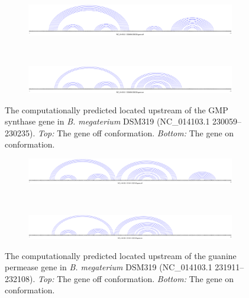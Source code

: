 \begin{figure}[!ht]
\centering
\begin{subfigure}[h]{\textwidth}
\centering
\includegraphics[width=.9\textwidth]{Figures/Ribofinder/NC_014103_1_230059_230235_OFF.pdf}
\end{subfigure} \\
\medskip
\begin{subfigure}[h]{\textwidth}
\centering
\includegraphics[width=.9\textwidth]{Figures/Ribofinder/NC_014103_1_230059_230235_ON.pdf}
\end{subfigure}
\caption{The computationally predicted \rb located upstream of the GMP synthase
gene in {\em B. megaterium} DSM319 (NC\_014103.1 230059--230235).
{\em Top:} The gene off conformation. {\em Bottom:} The gene on conformation.}
\label{fig:figure:NC_014103_1_230059_230235}
\end{figure}
\medskip

\begin{figure}[!ht]
\centering
\begin{subfigure}[h]{\textwidth}
\centering
\includegraphics[width=.9\textwidth]{Figures/Ribofinder/NC_014103_1_231911_232108_OFF.pdf}
\end{subfigure} \\
\medskip
\begin{subfigure}[h]{\textwidth}
\centering
\includegraphics[width=.9\textwidth]{Figures/Ribofinder/NC_014103_1_231911_232108_ON.pdf}
\end{subfigure}
\caption{The computationally predicted \rb located upstream of the guanine permease
gene in {\em B. megaterium} DSM319 (NC\_014103.1 231911--232108).
{\em Top:} The gene off conformation. {\em Bottom:} The gene on conformation.}
\label{fig:figure:NC_014103_1_231911_232108}
\end{figure}
\medskip

